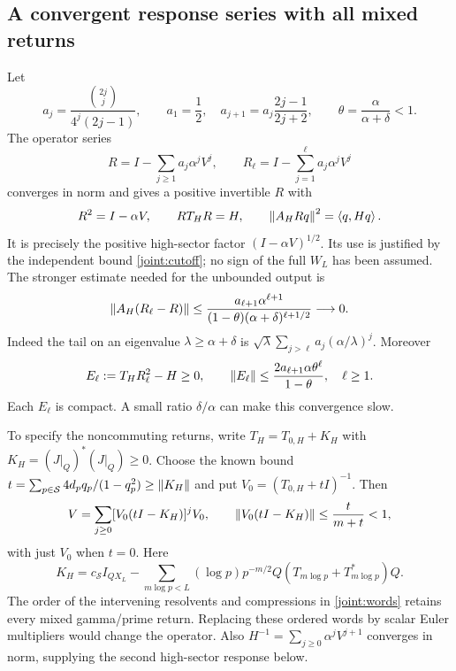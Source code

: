 \subsection{A convergent response series with all mixed returns}
Let
\[
a_j=\frac{\binom{2j}{j}}{4^j(2j-1)},\qquad
a_1=\frac12,\quad a_{j+1}=a_j\frac{2j-1}{2j+2},\qquad
\theta=\frac{\alpha}{\alpha+\delta}<1.
\]
The operator series
\begin{equation}\label{joint:series}
R=I-\sum_{j\ge1}a_j\alpha^jV^j,\qquad
R_\ell=I-\sum_{j=1}^{\ell}a_j\alpha^jV^j
\end{equation}
converges in norm and gives a positive invertible $R$ with
\[
R^2=I-\alpha V,\qquad RT_HR=H,\qquad
\left\lVert A_HRq\right\rVert^2=\left\langle q,Hq\right\rangle.
\]
It is precisely the positive high-sector factor
$(I-\alpha V)^{1/2}$. Its use is justified by the independent
bound \eqref{joint:cutoff}; no sign of the full $W_L$ has been
assumed.
The stronger estimate needed for the unbounded output is
\begin{equation}\label{joint:tail}
\left\lVert A_H(R_\ell-R)\right\rVert
\le\frac{a_{\ell+1}\alpha^{\ell+1}}
 {(1-\theta)(\alpha+\delta)^{\ell+1/2}}\longrightarrow0.
\end{equation}
Indeed the tail on an eigenvalue $\lambda\ge\alpha+\delta$ is
$\sqrt\lambda\sum_{j>\ell}a_j(\alpha/\lambda)^j$.
Moreover
\begin{equation}\label{joint:positive-error}
E_\ell:=T_HR_\ell^2-H\ge0,\qquad
\left\lVert E_\ell\right\rVert\le
\frac{2a_{\ell+1}\alpha\theta^\ell}{1-\theta},
\quad\ell\ge1.
\end{equation}
Each $E_\ell$ is compact. A small ratio $\delta/\alpha$ can make
this convergence slow.

To specify the noncommuting returns, write
$T_H=T_{0,H}+K_H$ with $K_H=(J|_Q)^*(J|_Q)\ge0$.
Choose the known bound
$t=\sum_{p\in\mathcal S}4d_pq_p/(1-q_p^2)\ge\left\lVert K_H\right\rVert$ and put
$V_0=(T_{0,H}+tI)^{-1}$. Then
\begin{equation}\label{joint:words}
V=\sum_{j\ge0}[V_0(tI-K_H)]^jV_0,\qquad
\left\lVert V_0(tI-K_H)\right\rVert\le\frac{t}{m+t}<1,
\end{equation}
with just $V_0$ when $t=0$. Here
\[
K_H=c_{\mathcal S}I_{QX_L}-
\sum_{m\log p<L}(\log p)p^{-m/2}
                      Q(T_{m\log p}+T_{m\log p}^*)Q.
\]
The order of the intervening resolvents and compressions in
\eqref{joint:words} retains every mixed gamma/prime return.
Replacing these ordered words by scalar Euler multipliers would
change the operator. Also
$H^{-1}=\sum_{j\ge0}\alpha^jV^{j+1}$ converges in norm, supplying
the second high-sector response below.

